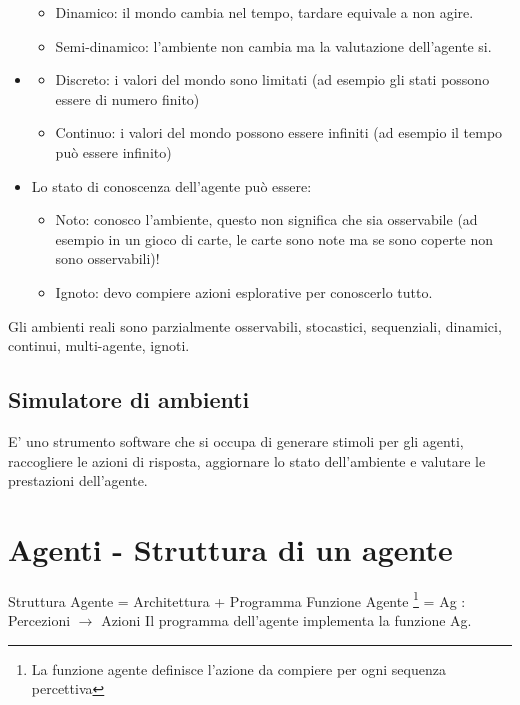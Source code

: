 \documentclass{article}
\begin{document}
\begin{itemize}
\begin{itemize}
            \item Dinamico: il mondo cambia nel tempo, tardare equivale a non agire.
            \item Semi-dinamico: l'ambiente non cambia ma la valutazione dell'agente si.
        \end{itemize}
    \item  
        \begin{itemize}
            \item Discreto: i valori del mondo sono limitati (ad esempio gli stati possono essere di numero finito)
            \item Continuo: i valori del mondo possono essere infiniti (ad esempio il tempo può essere infinito)
        \end{itemize}
    \item Lo stato di conoscenza dell'agente può essere:
        \begin{itemize}
            \item Noto: conosco l'ambiente, questo non significa che sia osservabile (ad esempio in un gioco di carte, le carte sono note ma se sono coperte non sono osservabili)!
            \item Ignoto: devo compiere azioni esplorative per conoscerlo tutto.
        \end{itemize}
\end{itemize}
Gli ambienti reali sono parzialmente osservabili, stocastici, sequenziali, dinamici, continui, multi-agente, ignoti.

\subsection{Simulatore di ambienti}
E' uno strumento software che si occupa di generare stimoli per gli agenti, raccogliere le azioni di risposta, aggiornare lo stato dell'ambiente e valutare le prestazioni dell'agente.
\clearpage

\section{Agenti - Struttura di un agente}
Struttura Agente = Architettura + Programma \newline
Funzione Agente \footnote{La funzione agente definisce l'azione da compiere per ogni sequenza percettiva} = Ag : Percezioni $\rightarrow$ Azioni \newline
Il programma dell'agente implementa la funzione Ag.
\end{document}
